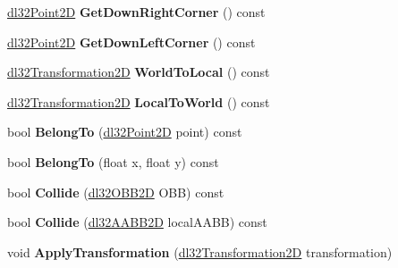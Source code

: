 \begin{DoxyCompactItemize}
\item 
\hypertarget{classdl32_o_b_b2_d_a8ef96b38ad89df2450f97c2d3faed2d5}{\hyperlink{structdl32_point2_d}{dl32\-Point2\-D} {\bfseries Get\-Down\-Right\-Corner} () const }\label{classdl32_o_b_b2_d_a8ef96b38ad89df2450f97c2d3faed2d5}

\item 
\hypertarget{classdl32_o_b_b2_d_a1c5372830e68b15caa9912a49f6231c5}{\hyperlink{structdl32_point2_d}{dl32\-Point2\-D} {\bfseries Get\-Down\-Left\-Corner} () const }\label{classdl32_o_b_b2_d_a1c5372830e68b15caa9912a49f6231c5}

\item 
\hypertarget{classdl32_o_b_b2_d_af933f887bd178d687c8e3812f85fe062}{\hyperlink{classdl32_transformation2_d}{dl32\-Transformation2\-D} {\bfseries World\-To\-Local} () const }\label{classdl32_o_b_b2_d_af933f887bd178d687c8e3812f85fe062}

\item 
\hypertarget{classdl32_o_b_b2_d_a2f1f033d4feac944271195eb204758e9}{\hyperlink{classdl32_transformation2_d}{dl32\-Transformation2\-D} {\bfseries Local\-To\-World} () const }\label{classdl32_o_b_b2_d_a2f1f033d4feac944271195eb204758e9}

\item 
\hypertarget{classdl32_o_b_b2_d_a1fed2e3383b7b94d32008967d3edeb85}{bool {\bfseries Belong\-To} (\hyperlink{structdl32_point2_d}{dl32\-Point2\-D} point) const }\label{classdl32_o_b_b2_d_a1fed2e3383b7b94d32008967d3edeb85}

\item 
\hypertarget{classdl32_o_b_b2_d_a2b6e41ca537625c8897be457dc87e781}{bool {\bfseries Belong\-To} (float x, float y) const }\label{classdl32_o_b_b2_d_a2b6e41ca537625c8897be457dc87e781}

\item 
\hypertarget{classdl32_o_b_b2_d_a6ce3bcbe1aba721ca183ecc184ebb240}{bool {\bfseries Collide} (\hyperlink{classdl32_o_b_b2_d}{dl32\-O\-B\-B2\-D} O\-B\-B) const }\label{classdl32_o_b_b2_d_a6ce3bcbe1aba721ca183ecc184ebb240}

\item 
\hypertarget{classdl32_o_b_b2_d_a767b6f6e1bf7c64e90b36429d6dfb232}{bool {\bfseries Collide} (\hyperlink{classdl32_a_a_b_b2_d}{dl32\-A\-A\-B\-B2\-D} local\-A\-A\-B\-B) const }\label{classdl32_o_b_b2_d_a767b6f6e1bf7c64e90b36429d6dfb232}

\item 
\hypertarget{classdl32_o_b_b2_d_a8148e2b49fc798cd30dea53821674865}{void {\bfseries Apply\-Transformation} (\hyperlink{classdl32_transformation2_d}{dl32\-Transformation2\-D} transformation)}\label{classdl32_o_b_b2_d_a8148e2b49fc798cd30dea53821674865}

\end{DoxyCompactItemize}
